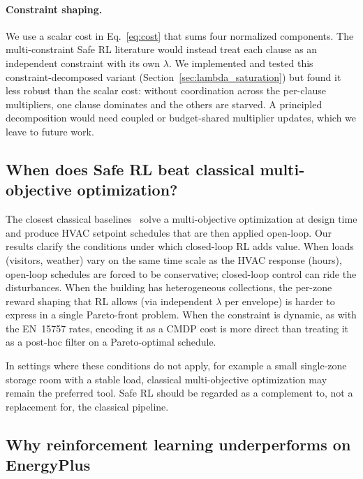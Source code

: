 \documentclass[11pt,a4paper]{article}
\begin{document}
\paragraph{Constraint shaping.}
We use a scalar cost in Eq.~\eqref{eq:cost} that sums four normalized
components. The multi-constraint Safe RL literature would instead treat
each clause as an independent constraint with its own $\lambda$. We
implemented and tested this constraint-decomposed variant
(Section~\ref{sec:lambda_saturation}) but found it less robust than the
scalar cost: without coordination across the per-clause multipliers,
one clause dominates and the others are starved. A principled
decomposition would need coupled or budget-shared multiplier updates,
which we leave to future work.

\subsection{When does Safe RL beat classical multi-objective optimization?}

The closest classical baselines~\citep{ascione2018museum,schito2020museum}
solve a multi-objective optimization at design time and produce HVAC
setpoint schedules that are then applied open-loop. Our results clarify
the conditions under which closed-loop RL adds value. When loads
(visitors, weather) vary on the same time scale as the HVAC response
(hours), open-loop schedules are forced to be conservative; closed-loop
control can ride the disturbances. When the building has heterogeneous
collections, the per-zone reward shaping that RL allows (via
independent $\lambda$ per envelope) is harder to express in a single
Pareto-front problem. When the constraint is dynamic, as with the
EN~15757 rates, encoding it as a CMDP cost is more direct than
treating it as a post-hoc filter on a Pareto-optimal schedule.

In settings where these conditions do not apply, for example a small
single-zone storage room with a stable load, classical multi-objective
optimization may remain the preferred tool. Safe RL should be regarded
as a complement to, not a replacement for, the classical pipeline.

\subsection{Why reinforcement learning underperforms on EnergyPlus}
\end{document}

